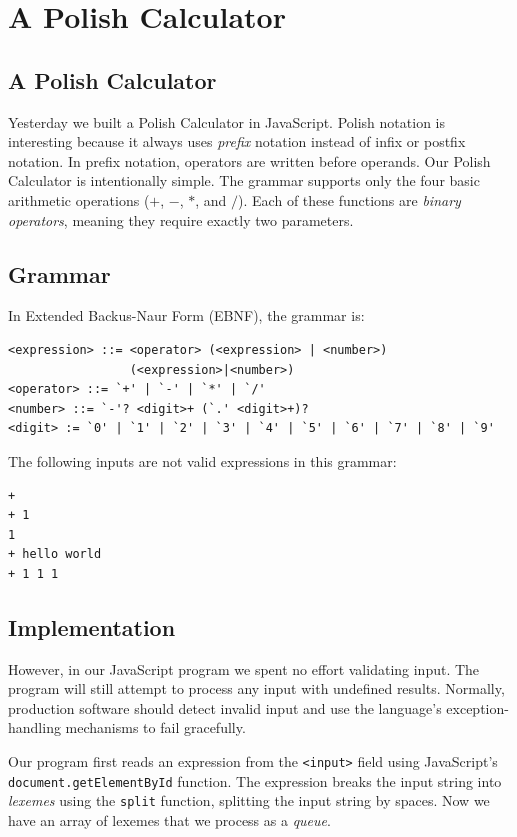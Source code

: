 \documentclass{book}
\begin{document}
\mainmatter

\chapter{A Polish Calculator}

\section{A Polish Calculator}
Yesterday we built a Polish Calculator in JavaScript. Polish notation is interesting because it always uses \textit{prefix} notation instead of infix or postfix notation. In prefix notation, operators are written before operands. Our Polish Calculator is intentionally simple. The grammar supports only the four basic arithmetic operations ($+$, $-$, $*$, and $/$). Each of these functions are \textit{binary operators}, meaning they require exactly two parameters.

\section{Grammar}
In Extended Backus-Naur Form (EBNF), the grammar is:

\begin{lstlisting}
<expression> ::= <operator> (<expression> | <number>)
                 (<expression>|<number>)
<operator> ::= `+' | `-' | `*' | `/'
<number> ::= `-'? <digit>+ (`.' <digit>+)?
<digit> := `0' | `1' | `2' | `3' | `4' | `5' | `6' | `7' | `8' | `9'
\end{lstlisting}

The following inputs are not valid expressions in this grammar:

\begin{lstlisting}
+
+ 1
1
+ hello world
+ 1 1 1
\end{lstlisting}

\section{Implementation}

However, in our JavaScript program we spent no effort validating input. The program will still attempt to process any input with undefined results. Normally, production software should detect invalid input and use the language's exception-handling mechanisms to fail gracefully.

Our program first reads an expression from the \texttt{<input>} field using JavaScript's \texttt{document.getElementById} function. The expression breaks the input string into \textit{lexemes} using the \texttt{split} function, splitting the input string by spaces. Now we have an array of lexemes that we process as a \textit{queue}.
\end{document}
